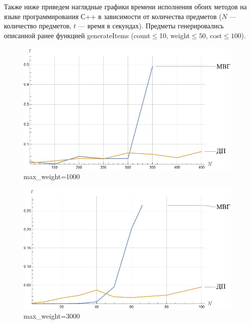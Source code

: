 \documentclass[12pt, a4paper]{article}
\begin{document}
	\medskip
	Также ниже приведем наглядные графики времени исполнения обоих методов на языке программирования С++ в зависимости от количества предметов ($N$ --- количество предметов, $t$ --- время в секундах). Предметы генерировались описанной ранее функцией generateItems (count$\le$10, weight$\le50$, cost$\le100$).
		\begin{figure}[H]
		\centering
		\includegraphics[scale=0.8]{plot1}
		\caption{max\_weight=1000}
	\end{figure}
	\begin{figure}[H]
		\centering
		\includegraphics[scale=0.8]{plot2}
		\caption{max\_weight=3000}	
	\end{figure}	
\end{document}
